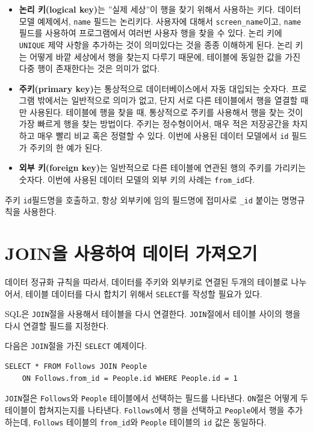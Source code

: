 \begin{itemize}

\item {\bf 논리 키(logical key)}는 ''실제 세상''이 행을 찾기 위해서 사용하는 키다.
데이터 모델 예제에서, {\tt name} 필드는 논리키다. 
사용자에 대해서 \verb"screen_name"이고, {\tt name} 필드를 사용하여 프로그램에서 여러번 사용자 행을 찾을 수 있다.
논리 키에 {\tt UNIQUE} 제약 사항을 추가하는 것이 의미있다는 것을 종종 이해하게 된다.
논리 키는 어떻게 바깥 세상에서 행을 찾는지 다루기 때문에, 테이블에 동일한 값을 가진 다중 행이 존재한다는 것은 의미가 없다.

\item {\bf 주키(primary key)}는 통상적으로 데이터베이스에서 자동 대입되는 숫자다.
프로그램 밖에서는 일반적으로 의미가 없고, 단지 서로 다른 테이블에서 행을 열결할 때만 사용된다.
테이블에 행을 찾을 때, 통상적으로 주키를 사용해서 행을 찾는 것이 가장 빠르게 행을 찾는 방법이다.
주키는 정수형이어서, 매우 적은 저장공간을 차지하고 매우 빨리 비교 혹은 정렬할 수 있다.
이번에 사용된 데이터 모델에서 {\tt id} 필드가 주키의 한 예가 된다.

\item {\bf 외부 키(foreign key)}는 일반적으로 다른 테이블에 연관된 행의 주키를 가리키는 숫자다.
이번에 사용된 데이터 모델의 외부 키의 사례는 \verb"from_id"다.

\end{itemize}

주키 {\tt id}필드명을 호출하고, 항상 외부키에 임의 필드명에 접미사로 \verb"_id" 붙이는 명명규칙을 사용한다.

\section{JOIN을 사용하여 데이터 가져오기}

데이터 정규화 규칙을 따라서, 데이터를 주키와 외부키로 연결된 두개의 테이블로 나누어서,
테이블 데이터를 다시 합치기 위해서 {\tt SELECT}를 작성할 필요가 있다.

SQL은 {\tt JOIN}절을 사용해서 테이블을 다시 연결한다. 
{\tt JOIN}절에서 테이블 사이의 행을 다시 연결할 필드를 지정한다.

다음은 {\tt JOIN}절을 가진 {\tt SELECT} 예제이다.

\beforeverb
\begin{verbatim}
SELECT * FROM Follows JOIN People 
    ON Follows.from_id = People.id WHERE People.id = 1
\end{verbatim}
\afterverb
%

{\tt JOIN}절은 {\tt Follows}와 {\tt People} 테이블에서 선택하는 필드를 나타낸다. 
{\tt ON}절은 어떻게 두 테이블이 합쳐지는지를 나타낸다.
{\tt Follows}에서 행을 선택하고 {\tt People}에서 행을 추가하는데, 
{\tt Follows} 테이블의 \verb"from_id"와 {\tt People} 테이블의 {\tt id} 값은 동일하다.

